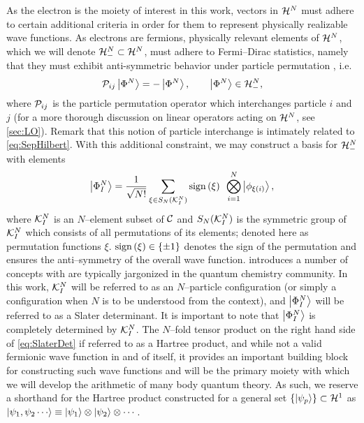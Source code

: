 As the electron is the moiety of interest in this work, vectors in $\mathcal{H}^N$ must adhere to certain additional 
criteria in order for them to represent physically realizable wave functions. As electrons are 
fermions, physically relevant elements of $\mathcal{H}^N$, which we will denote $\mathcal{H}^N_- \subset \mathcal{H}^N$, must 
adhere to Fermi--Dirac statistics, namely that they must exhibit anti-symmetric behavior under particle permutation
\cite{Walecka12_book,Schuck04_book}, i.e.
\begin{equation}
  \label{eq:FermiDirac}
  \mathcal{P}_{ij} \left\vert \Phi^N \right\rangle = -\left\vert \Phi^N \right\rangle, \qquad \left\vert \Phi^N \right\rangle \in \mathcal{H}^N_-,
\end{equation} 
where $\mathcal{P}_{ij}$ is the particle permutation operator which interchanges particle $i$ and $j$ 
(for a more thorough discussion on linear operators acting on $\mathcal{H}^N$, see \cref{sec:LO}). Remark
that this notion of particle interchange is intimately related to \cref{eq:SepHilbert}. With this additional
constraint, we may construct a basis for $\mathcal{H}^N_-$ with elements 
\begin{equation}
  \label{eq:SlaterDet}
  \left\vert \Phi^N_I \right\rangle = \frac{1}{\sqrt{N!}} \sum_{\xi \in S_N(\mathcal{K}^N_I)} \mathrm{sign}\left( \xi \right) \text{ } \bigotimes_{i = 1 }^N \left\vert \phi_{\xi(i)} \right\rangle,
\end{equation}
where $\mathcal{K}_I^N$ is an $N$--element subset of $\mathcal{C}$ and $S_N(\mathcal{K}_I^N)$ is the symmetric group
of $\mathcal{K}_I^N$ which consists of all permutations of its elements; denoted here as permutation
functions $\xi$. $\mathrm{sign}\left( \xi \right) \in \{ \pm 1 \}$ denotes the sign of the permutation and ensures the anti--symmetry of
the overall wave function.  introduces a number of concepts with are typically jargonized 
in the quantum chemistry community. In this work, $\mathcal{K}_I^N$ will be referred to as an $N$--particle
configuration (or simply a configuration when $N$ is to be understood from the context), and $\left\vert \Phi^N_I \right\rangle$
will be referred to as a Slater determinant. It is important to note that $\left\vert \Phi^N_I \right\rangle$ is completely 
determined by $\mathcal{K}_I^N$. The $N$--fold tensor product on the right hand side of \cref{eq:SlaterDet}
if referred to as a Hartree product, and while not a valid fermionic wave function in and of itself,
it provides an important building block for constructing such wave functions and will be the primary
moiety with which we will develop the arithmetic of many body quantum theory. As such, we reserve a shorthand
for the Hartree product constructed for a general set $\left \lbrace \left\vert \psi_p \right\rangle \right\rbrace\subset\mathcal{H}^1$ as
$ \ket{\psi_1,\psi_2\cdots} \equiv \ket{\psi_1} \otimes \ket{\psi_2} \otimes \cdots$.


